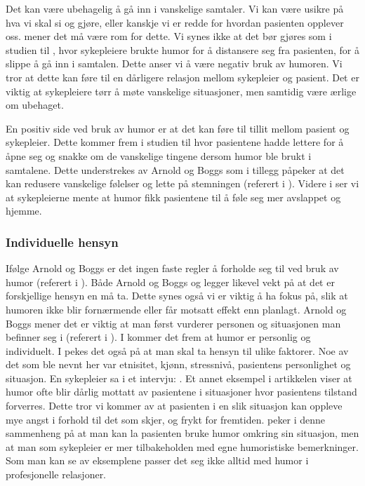 Det kan være ubehagelig å gå inn i vanskelige samtaler. Vi kan være usikre på
hva vi skal si og gjøre, eller kanskje vi er redde for hvordan pasienten
opplever oss.  mener det må være rom for dette.
Vi synes ikke at det bør gjøres som i studien til , hvor
sykepleiere brukte humor for å distansere seg fra pasienten, for å slippe å gå
inn i samtalen.  Dette anser vi å være negativ bruk av humoren. Vi tror at
dette kan føre til en dårligere relasjon mellom sykepleier og pasient. Det er
viktig at sykepleiere tørr å møte vanskelige situasjoner, men samtidig være
ærlige om ubehaget.

En positiv side ved bruk av humor er at det kan føre til tillit mellom pasient
og sykepleier. Dette kommer frem i studien til  hvor
pasientene hadde lettere for å åpne seg og snakke om de vanskelige tingene
dersom humor ble brukt i samtalene. Dette understrekes av Arnold og Boggs som
i tillegg påpeker at det kan redusere vanskelige følelser og lette på
stemningen (referert i ). Videre i  ser vi at
sykepleierne mente at humor fikk pasientene til å føle seg mer avslappet og
hjemme.

\subsubsection{Individuelle hensyn}

Ifølge Arnold og Boggs er det ingen faste regler å forholde seg til ved bruk
av humor (referert i ). Både Arnold og Boggs og
 legger likevel vekt på at det er forskjellige hensyn en må
ta. Dette synes også vi er viktig å ha fokus på, slik at humoren ikke blir
fornærmende eller får motsatt effekt enn planlagt. Arnold og Boggs mener det
er viktig at man først vurderer personen og situasjonen man befinner seg i
(referert i ). I  kommer det frem at humor er
personlig og individuelt. I  pekes det også på at man skal ta
hensyn til ulike faktorer. Noe av det som ble nevnt her var etnisitet, kjønn,
stressnivå, pasientens personlighet og situasjon. En sykepleier sa i et
intervju: . Et annet eksempel i artikkelen viser at humor ofte blir
dårlig mottatt av pasientene i situasjoner hvor pasientens tilstand forverres.
Dette tror vi kommer av at pasienten i en slik situasjon kan oppleve mye angst
i forhold til det som skjer, og frykt for fremtiden.  peker i
denne sammenheng på at man kan la pasienten bruke humor omkring sin situasjon,
men at man som sykepleier er mer tilbakeholden med egne humoristiske
bemerkninger. Som man kan se av eksemplene passer det seg ikke alltid med humor
i profesjonelle relasjoner.

